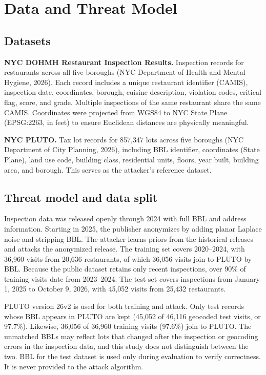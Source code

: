 \documentclass[11pt]{article}
\begin{document}
\section{Data and Threat Model}

\subsection{Datasets}

\textbf{NYC DOHMH Restaurant Inspection Results.} Inspection records for restaurants across all five boroughs (NYC Department of Health and Mental Hygiene, 2026). Each record includes a unique restaurant identifier (CAMIS), inspection date, coordinates, borough, cuisine description, violation codes, critical flag, score, and grade. Multiple inspections of the same restaurant share the same CAMIS. Coordinates were projected from WGS84 to NYC State Plane (EPSG:2263, in feet) to ensure Euclidean distances are physically meaningful.

\textbf{NYC PLUTO.} Tax lot records for 857,347 lots across five boroughs (NYC Department of City Planning, 2026), including BBL identifier, coordinates (State Plane), land use code, building class, residential units, floors, year built, building area, and borough. This serves as the attacker's reference dataset.

\subsection{Threat model and data split}

Inspection data was released openly through 2024 with full BBL and address information. Starting in 2025, the publisher anonymizes by adding planar Laplace noise and stripping BBL. The attacker learns priors from the historical releases and attacks the anonymized release. The training set covers 2020--2024, with 36,960 visits from 20,636 restaurants, of which 36,056 visits join to PLUTO by BBL. Because the public dataset retains only recent inspections, over 90\% of training visits date from 2023--2024. The test set covers inspections from January 1, 2025 to October 9, 2026, with 45,052 visits from 25,432 restaurants.

PLUTO version 26v2 is used for both training and attack. Only test records whose BBL appears in PLUTO are kept (45,052 of 46,116 geocoded test visits, or 97.7\%). Likewise, 36,056 of 36,960 training visits (97.6\%) join to PLUTO. The unmatched BBLs may reflect lots that changed after the inspection or geocoding errors in the inspection data, and this study does not distinguish between the two. BBL for the test dataset is used only during evaluation to verify correctness. It is never provided to the attack algorithm.
\end{document}
